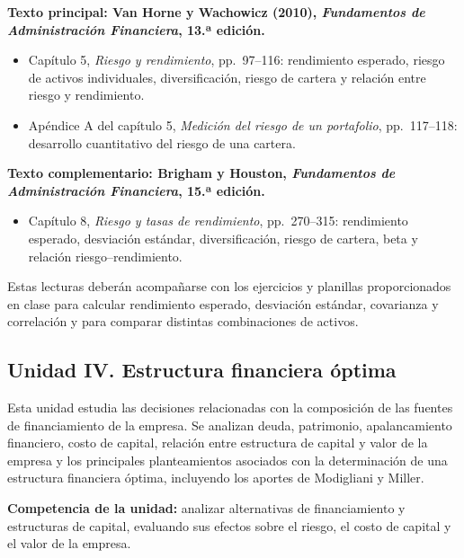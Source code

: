 \documentclass[12pt,a4paper]{article}
\begin{document}
\textbf{Texto principal: Van Horne y Wachowicz (2010),
\textit{Fundamentos de Administración Financiera}, 13.ª edición.}

\begin{itemize}
    \item Capítulo 5, \textit{Riesgo y rendimiento},
    pp.~97--116: rendimiento esperado, riesgo de activos individuales,
    diversificación, riesgo de cartera y relación entre riesgo y
    rendimiento.

    \item Apéndice A del capítulo 5,
    \textit{Medición del riesgo de un portafolio},
    pp.~117--118: desarrollo cuantitativo del riesgo de una cartera.
\end{itemize}

\noindent
\textbf{Texto complementario: Brigham y Houston,
\textit{Fundamentos de Administración Financiera}, 15.ª edición.}

\begin{itemize}
    \item Capítulo 8, \textit{Riesgo y tasas de rendimiento},
    pp.~270--315: rendimiento esperado, desviación estándar,
    diversificación, riesgo de cartera, beta y relación
    riesgo--rendimiento.
\end{itemize}

\noindent
Estas lecturas deberán acompañarse con los ejercicios y planillas
proporcionados en clase para calcular rendimiento esperado, desviación
estándar, covarianza y correlación y para comparar distintas combinaciones
de activos.
\parencite{vanhorne2010fundamentos,brigham2020fundamentos}

\subsection{Unidad IV. Estructura financiera óptima}

Esta unidad estudia las decisiones relacionadas con la composición de
las fuentes de financiamiento de la empresa. Se analizan deuda, patrimonio,
apalancamiento financiero, costo de capital, relación entre estructura de
capital y valor de la empresa y los principales planteamientos asociados
con la determinación de una estructura financiera óptima, incluyendo los
aportes de Modigliani y Miller.
\parencite{uaProgramaFinanzasLargoPlazo}

\textbf{Competencia de la unidad:} analizar alternativas de financiamiento
y estructuras de capital, evaluando sus efectos sobre el riesgo, el costo
de capital y el valor de la empresa.
\end{document}
